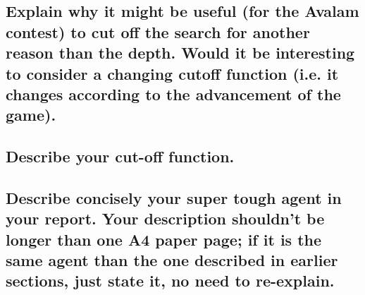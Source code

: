 \documentclass[10pt,a4paper]{article}
\begin{document}
\subsection{Explain why it might be useful (for the Avalam contest) to cut off the search for another reason than the depth. Would it be interesting to consider a changing cutoff function (i.e. it changes according to the advancement of the game).}



\subsection{Describe your cut-off function.}

\subsection{Describe concisely your super tough agent in your report. Your description shouldn’t be longer than one A4 paper page; if it is the same agent than the one described in earlier sections, just state it, no need to re-explain.}
\end{document}
